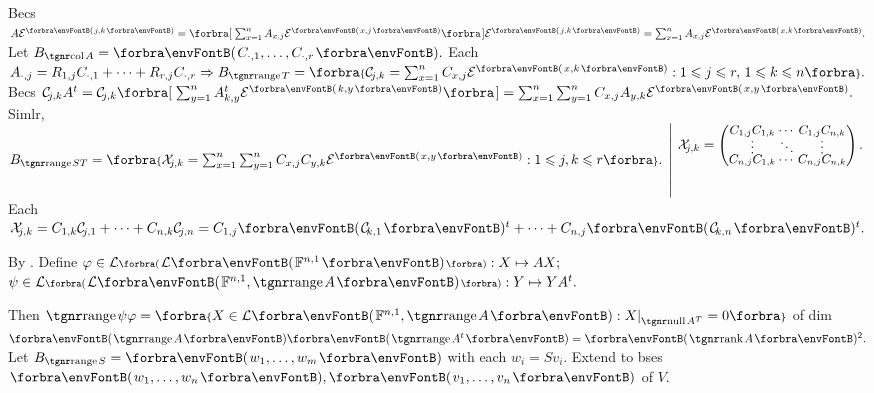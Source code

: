 Becs $A\mEnt{j,k}=\BigSbra{\sum_{x=1}^nA_{x,j}\mEnt{x,j}}\mEnt{j,k}=\sum_{x=1}^nA_{x,j}\mEnt{x,k}.$ \;Let $B_{\col A}=\Par{C_{\cdot,1},\dots,C_{\cdot,r}}.$\vspace{2pt}\parSol{}
Each $A_{\cdot,j}=R_{1,j}C_{\cdot,1}+\dots+R_{r,j}C_{\cdot,r}\Rightarrow B_{\range T}=\Bra{\mC_{\!j,k}=\sum_{x=1}^nC_{x,j}\mEnt{x,k}:1\leqslant j\leqslant r,\,1\leqslant k\leqslant n}.$\vspace{4pt}\parSol{}
Becs $\mC_{\!j,k}A^t=\mC_{\!j,k}\BigSbra{\sum_{y=1}^nA^t_{k,y}\mEnt{k,y}}=\sum_{x=1}^n\sum_{y=1}^nC_{x,j}A_{y,k}\mEnt{x,y}.$\vspace{-20pt}\parSol{}
Simlr, $B_{\range ST}=\Bra{\mX_{\!j,k}=\sum_{x=1}^n\sum_{y=1}^nC_{x,j}C_{y,k}\mEnt{x,y}:1\leqslant j,k\leqslant r}.\;\hMath{l}{\left|}{\right.}{\;\mX_{\!j,k}=\small\begin{pmatrix}C_{1,j}C_{1,k} &\hspace{-8pt} \cdots &\hspace{-8pt} C_{1,j}C_{n,k}\\[-4pt]
		\vdots &\hspace{-8pt} \ddots &\hspace{-8pt} \vdots\\[-4pt]
		C_{n,j}C_{1,k} &\hspace{-8pt} \cdots &\hspace{-8pt} C_{n,j}C_{n,k}\end{pmatrix}.\\[20pt]\,}$\vspace{-20pt}\parSol{}
Each $\mX_{\!j,k}=C_{1,k}\mC_{\!j,1}+\dots+C_{n,k}\mC_{\!j,n}=C_{1,j}\Par{\mC_{\!k,1}}{^t}+\dots+C_{n,j}\Par{\mC_{\!k,n}}{^t}.$\PfEnd\vspace{6pt}\par\quad
\Or By . Define $\varphi\in\Lm[\BigPar]{\Lm{\Fbb^{n,1}}}:X\mapsto AX;$ \;$\psi\in\Lm[\BigPar]{\Lm{\Fbb^{n,1},\range A}}:Y\mapsto YA^t.$\par\quad
Then $\range\psi\varphi=\Bra{X\in\Lm{\Fbb^{n,1},\range A}:X\mmid_{\null A^T}=0}$ of dim $\Par{{\range A}}\Par{{\range A^t}}=\Par{\rank A}{^2}.$\PfEnd
\SepLine
{}Let $B_{\range S}=\Par{w_1,\dots,w_m}$ with each $w_i=Sv_i.$ Extend to bses $\Par{w_1,\dots,w_n},\Par{v_1,\dots,v_n}$ of $V.$\parSol{}
